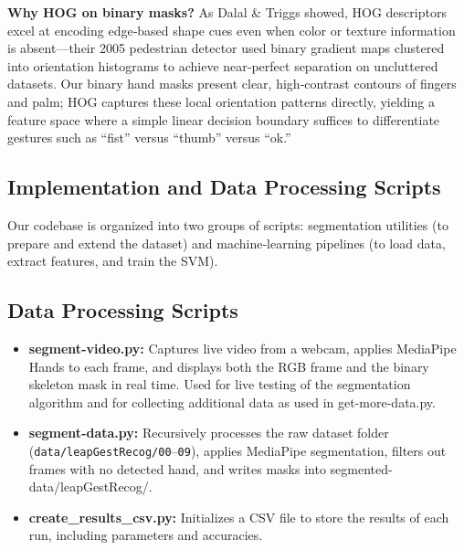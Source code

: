 \documentclass{article}
\begin{document}
\noindent\textbf{Why HOG on binary masks?}  
As Dalal \& Triggs showed, HOG descriptors excel at encoding edge‐based shape cues even when color or texture information is absent—their 2005 pedestrian detector used binary gradient maps clustered into orientation histograms to achieve near‐perfect separation on uncluttered datasets.  Our binary hand masks present clear, high‐contrast contours of fingers and palm; HOG captures these local orientation patterns directly, yielding a feature space where a simple linear decision boundary suffices to differentiate gestures such as “fist” versus “thumb” versus “ok.”  

\subsection{Implementation and Data Processing Scripts}

Our codebase is organized into two groups of scripts: segmentation utilities (to prepare and extend the dataset) and machine‐learning pipelines (to load data, extract features, and train the SVM).

\subsection{Data Processing Scripts}
\begin{itemize}
    \item \textbf{segment-video.py:} Captures live video from a webcam, applies MediaPipe Hands to each frame, and displays both the RGB frame and the binary skeleton mask in real time. Used for live testing of the segmentation algorithm and for collecting additional data as used in get-more-data.py.
    \item \textbf{segment-data.py:} Recursively processes the raw dataset folder (\texttt{data/leapGestRecog/00}--\texttt{09}), applies MediaPipe segmentation, filters out frames with no detected hand, and writes masks into 
    segmented-data/leapGestRecog/.
    \item \textbf{create\_results\_csv.py:} Initializes a CSV file to store the results of each run, including parameters and accuracies.
\end{itemize}
\end{document}
